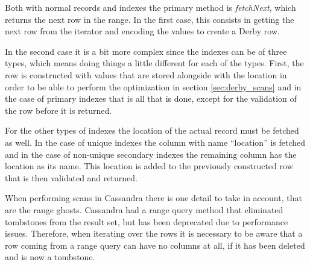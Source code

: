 Both with normal records and indexes the primary method is \emph{fetchNext}, which returns the next row in the range. In the first case, this consists in getting the next row from the iterator and encoding the values to create a Derby row. 

In the second case it is a bit more complex since the indexes can be of three types, which means doing things a little different for each of the types. First, the row is constructed with values that are stored alongside with the location in order to be able to perform the optimization in section \ref{sec:derby_scans} and in the case of primary indexes that is all that is done, except for the validation of the row before it is returned. 

For the other types of indexes the location of the actual record must be fetched as well. In the case of unique indexes the column with name ``location'' is fetched and in the case of non-unique secondary indexes the remaining column has the location as its name. This location is added to the previously constructed row that is then validated and returned.

When performing scans in Cassandra there is one detail to take in account, that are the range ghosts. Cassandra had a range query method that eliminated tombstones from the result set, but has been deprecated due to performance issues. Therefore, when iterating over the rows it is necessary to be aware that a row coming from a range query can have no columns at all, if it has been deleted and is now a tombstone.  

